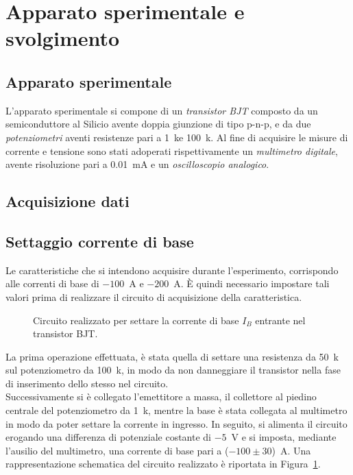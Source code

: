 \documentclass[../main.tex]{subfiles}
\begin{document}
    \section{Apparato sperimentale e svolgimento} \label{sec:acquisizione}

    \subsection{Apparato sperimentale}\label{subsec:apparato-sperimentale}

    L'apparato sperimentale si compone di un \textit{transistor BJT} composto da un
    semiconduttore al Silicio avente doppia giunzione di tipo p-n-p, e da due
    \textit{potenziometri} aventi resistenze pari a 1~k\textohm\;e 100~k\textohm.
    Al fine di acquisire le misure di corrente e tensione sono stati adoperati
    rispettivamente un \textit{multimetro digitale}, avente risoluzione pari a
    0.01~mA e un \textit{oscilloscopio analogico}.

    \subsection{Acquisizione dati}\label{subsec:acquisizione-dati}
    \vspace{0.2cm}
    \subsection*{Settaggio corrente di base}

    Le caratteristiche che si intendono acquisire durante l'esperimento,
    corrispondo alle correnti di base di $-100$~\textmu A e $-200$~\textmu A.
    È quindi necessario impostare tali valori prima di realizzare il circuito
    di acquisizione della caratteristica.

    \begin{figure}[h!]
        \centering
        
        \caption{Circuito realizzato per settare la corrente di base $I_B$ entrante nel transistor BJT.}
        \label{fig:circuito-corrente-base}
    \end{figure}

    \noindent La prima operazione effettuata, è stata quella di settare
    una resistenza da 50~k\textohm\; sul potenziometro da 100~k\textohm,
    in modo da non danneggiare il transistor nella fase di inserimento dello stesso nel circuito. \\
    Successivamente si è collegato l'emettitore a massa, il collettore al piedino centrale
    del potenziometro da 1~k\textohm, mentre la base è stata collegata al multimetro
    in modo da poter settare la corrente in ingresso.
    In seguito, si alimenta il circuito erogando una differenza di potenziale
    costante di $-5$~V e si imposta, mediante l'ausilio del multimetro,
    una corrente di base pari a ($-100 \pm 30$)~\textmu A.
    Una rappresentazione schematica del circuito realizzato è riportata
    in Figura~\ref{fig:circuito-corrente-base}.
\end{document}
